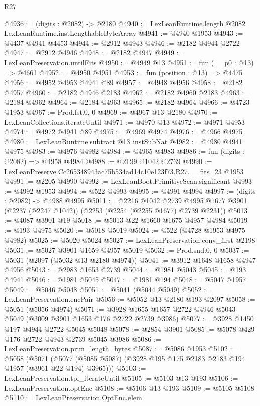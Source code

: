 \begin{lexlean}{R27}
\begin{coremodule}
@4936 := (digits : @2082) -> @2180
@4940 := LexLeanRuntime.length @2082 LexLeanRuntime.instLengthableByteArray
@4941 := @4940 @1953
@4943 := @4437 @4941 @4453
@4944 := @2912 @4943
@4946 := @2182 @4944 @2722
@4947 := @2912 @4946
@4948 := @2182 @4947
@4949 := LexLeanPreservation.untilFits
@4950 := @4949 @13
@4951 := fun (__p0 : @13) => @4661
@4952 := @4950 @4951
@4953 := fun (position : @13) => @4475
@4956 := @4952 @4953 @4941 @89
@4957 := @4948 @4956
@4958 := @2182 @4957
@4960 := @2182 @4946 @2183
@4962 := @2182 @4960 @2183
@4963 := @2184 @4962
@4964 := @2184 @4963
@4965 := @2182 @4964
@4966 := @4723 @1953
@4967 := Prod.fst.{0, 0}
@4969 := @4967 @13 @2180
@4970 := LexLeanCollections.iterateUntil
@4971 := @4970 @13
@4972 := @4971 @4953
@4974 := @4972 @4941 @89
@4975 := @4969 @4974
@4976 := @4966 @4975
@4980 := LexLeanRuntime.subtract @13 instSubNat
@4982 := @4980 @4941 @4975
@4983 := @4976 @4982
@4984 := @4965 @4983
@4986 := fun (digits : @2082) => @4958 @4984
@4988 := @2199 @1042 @2739
@4990 := LexLeanPreserve.Cc265348943ac75b534ad14c10e123f73.R27.__fits_23 @1953
@4991 := @2205 @4990
@4992 := LexLeanBoot.PrimitiveScan.significant
@4993 := @4992 @1953
@4994 := @522 @4993
@4995 := @4991 @4994
@4997 := (digits : @2082) -> @4988 @4995
@5011 := @2216
    @1042
    @2739
    @4995
    @1677
    @3901
    (@2237 (@2247 @1042))
    (@2253 (@2254 (@2255 @1677) @2739 @2231))
@5013 := @4087 @3901 @19
@5018 := @5013 @22 @1660 @1675 @4957 @4984
@5019 := @193 @4975
@5020 := @5018 @5019
@5024 := @522 (@4728 @1953 @4975 @4982)
@5025 := @5020 @5024
@5027 := LexLeanPreservation.conv_first @2198
@5031 := @5027 @3901 @1659 @4957 @5019
@5032 := Prod.snd.{0, 0}
@5037 := @5031 (@2097 (@5032 @13 @2180 @4974))
@5041 := @3912 @1648 @1658 @4947 @4956
@5043 := @2983 @1653 @2739
@5044 := @1981 @5043
@5045 := @193 @4941
@5046 := @1981 @5045
@5047 := @1981 @194
@5048 := @5047 @1957
@5049 := @5046 @5048
@5051 := @5041 (@5044 @5049)
@5052 := LexLeanPreservation.encPair
@5056 := @5052 @13 @2180 @193 @2097
@5058 := @5051 (@5056 @4974)
@5071 := @3928 @1655 @1657 @2722 @4946 @5043 @5049 (@3009 @3901 @1653 @176 @2722 @2739 @3986)
@5077 := @3928 @1450 @197 @4944 @2722 @5045 @5048
@5078 := @2854 @3901
@5085 := @5078 @429 @176 @2722 @4943 @2739 @5045 @3986
@5086 := LexLeanPreservation.prim_length_bytes
@5087 := @5086 @1953
@5102 := @5058
    (@5071 (@5077 (@5085 @5087) (@3928 @195 @175 @2183 @2183 @194 @1957 (@3961 @22 @194) @3965)))
@5103 := LexLeanPreservation.tpl_iterateUntil
@5105 := @5103 @13 @193
@5106 := LexLeanPreservation.optEnc
@5108 := @5106 @13 @193
@5109 := @5105 @5108
@5110 := LexLeanPreservation.OptEnc.elem

\end{coremodule}
\end{lexlean}
